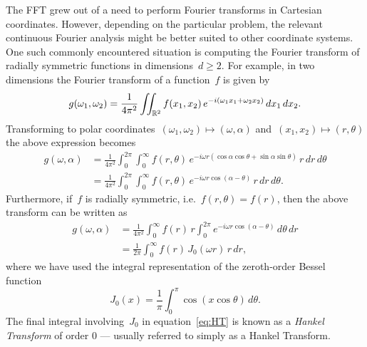 The FFT grew out of a need to perform Fourier transforms in Cartesian
coordinates. However, depending on the particular problem, the relevant
continuous Fourier analysis might be better suited to other coordinate systems.
One such commonly encountered situation is computing the Fourier transform of
radially symmetric functions in dimensions~$d \geq 2$. For example, in two
dimensions the Fourier transform of a function~$f$ is given by
\begin{equation}
  g(\omega_1, \omega_2) = \frac{1}{4\pi^2} \iint_{\mathbb{R}^2} f(x_1, x_2) \, 
  e^{-i(\omega_1 x_1 + \omega_2 x_2)}  \, dx_1 \, dx_2.
\end{equation}
Transforming to polar coordinates~$(\omega_1,\omega_2) \mapsto (\omega,\alpha)$
and~$(x_1,x_2) \mapsto (r,\theta)$ the above expression becomes
\begin{equation}
  \label{eq:ftpolar}
  \begin{aligned}
    g(\omega, \alpha) &= \frac{1}{4\pi^2} \int_0^{2\pi} \int_0^\infty
    f(r,\theta) \, 
    e^{-i \omega r (\cos\alpha \cos\theta + \sin\alpha \sin\theta) } 
    \, r \, dr \, d\theta \\
  &= \frac{1}{4\pi^2} \int_0^{2\pi} \int_0^\infty f(r,\theta) \, e^{-i \omega r \cos(\alpha-\theta) } \, r \, dr \, d\theta.
  \end{aligned}
\end{equation}
Furthermore, if~$f$ is radially symmetric, i.e.~$f(r, \theta) = f(r)$, then the
above transform can be written as
\begin{equation}
  \label{eq:HT}
  \begin{aligned}
  g(\omega,\alpha) &= \frac{1}{4\pi^2} \int_0^\infty f(r) \, r \int_0^{2\pi} 
  e^{-i \omega r \cos(\alpha - \theta) }  \, d\theta \, dr \\
  &= \frac{1}{2\pi} \int_0^\infty f(r) \, J_0(\omega r) \, r \, dr,
  \end{aligned}
\end{equation}
where we have used the integral representation of the zeroth-order Bessel
function~\cite{olver2010nist}
\begin{equation}
  J_0(x) 
  = \frac{1}{\pi} \int_0^\pi \cos \left( x \cos \theta \right) \, d\theta.
\end{equation}
The final integral involving~$J_0$ in equation~\eqref{eq:HT} is known as a
\emph{Hankel Transform} of order 0 --- usually referred to simply as a Hankel
Transform. 

